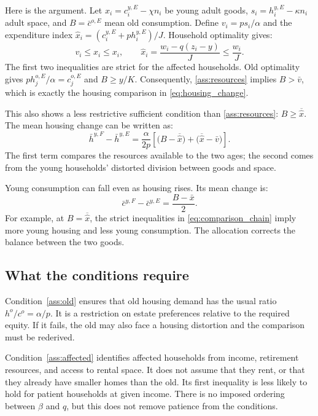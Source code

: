 \documentclass[11pt]{article}
\newcommand{\avg}[1]{\overline{#1}}
\begin{document}
Here is the argument. Let $x_i=c_i^{y,E}-\chi n_i$ be young adult goods,
$s_i=h_i^{y,E}-\kappa n_i$ adult space, and $B=\bar c^{o,E}$ mean old
consumption. Define $v_i=ps_i/\alpha$ and the expenditure index
$\widehat x_i=(c_i^{y,E}+ph_i^{y,E})/J$. Household optimality gives:
\begin{equation}
v_i\le\widehat x_i\le x_i,\qquad
\widehat x_i=\frac{w_i-q(z_i-y)}{J}\le\frac{w_i}{J}.
\label{eq:comparison_chain}
\end{equation}
The first two inequalities are strict for the affected households. Old
optimality gives $ph_j^{o,E}/\alpha=c_j^{o,E}$ and $B\ge y/K$.
Consequently, \eqref{ass:resources} implies $B>\bar v$, which is exactly
the housing comparison in \eqref{eq:housing_change}.

This also shows a less restrictive sufficient condition than
\eqref{ass:resources}: $B\ge\avg{\widehat x}$. The mean housing change can
be written as:
\begin{equation}
\bar h^{y,F}-\bar h^{y,E}
 =\frac{\alpha}{2p}
   \left[\bigl(B-\avg{\widehat x}\bigr)
          +\bigl(\avg{\widehat x}-\bar v\bigr)\right].
\label{eq:housing_decomposition}
\end{equation}
The first term compares the resources available to the two ages; the second
comes from the young households' distorted division between goods and space.

Young consumption can fall even as housing rises. Its mean change is:
\begin{equation}
\bar c^{y,F}-\bar c^{y,E}=\frac{B-\bar x}{2}.
\label{eq:consumption_change}
\end{equation}
For example, at $B=\avg{\widehat x}$, the strict inequalities in
\eqref{eq:comparison_chain} imply more young housing and less young
consumption. The allocation corrects the balance between the two goods.

\subsection{What the conditions require}

Condition~\eqref{ass:old} ensures that old housing demand has the usual ratio
$h^o/c^o=\alpha/p$. It is a restriction on estate preferences relative to
the required equity. If it fails, the old may also face a housing distortion
and the comparison must be rederived.

Condition~\eqref{ass:affected} identifies affected households from income,
retirement resources, and access to rental space. It does not assume that
they rent, or that they already have smaller homes than the old. Its first
inequality is less likely to hold for patient households at given income.
There is no imposed ordering between $\beta$ and $q$, but this does not
remove patience from the conditions.
\end{document}

